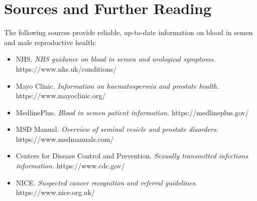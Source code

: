 \section*{Sources and Further Reading}
The following sources provide reliable, up-to-date information on blood in semen and male reproductive health:

\begin{itemize}
    \item NHS. \textit{NHS guidance on blood in semen and urological symptoms.} https://www.nhs.uk/conditions/
    \item Mayo Clinic. \textit{Information on haematospermia and prostate health.} https://www.mayoclinic.org/
    \item MedlinePlus. \textit{Blood in semen patient information.} https://medlineplus.gov/
    \item MSD Manual. \textit{Overview of seminal vesicle and prostate disorders.} https://www.msdmanuals.com/
    \item Centers for Disease Control and Prevention. \textit{Sexually transmitted infections information.} https://www.cdc.gov/
    \item NICE. \textit{Suspected cancer recognition and referral guidelines.} https://www.nice.org.uk/
\end{itemize}

